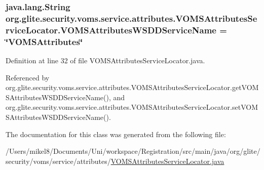 \hypertarget{classorg_1_1glite_1_1security_1_1voms_1_1service_1_1attributes_1_1VOMSAttributesServiceLocator_a67693b0915b16c01b7a636c852553fdd}{
\subsubsection[{VOMSAttributesWSDDServiceName}]{\setlength{\rightskip}{0pt plus 5cm}java.lang.String {\bf org.glite.security.voms.service.attributes.VOMSAttributesServiceLocator.VOMSAttributesWSDDServiceName} = \char`\"{}VOMSAttributes\char`\"{}}}
\label{classorg_1_1glite_1_1security_1_1voms_1_1service_1_1attributes_1_1VOMSAttributesServiceLocator_a67693b0915b16c01b7a636c852553fdd}


Definition at line 32 of file VOMSAttributesServiceLocator.java.



Referenced by org.glite.security.voms.service.attributes.VOMSAttributesServiceLocator.getVOMSAttributesWSDDServiceName(), and org.glite.security.voms.service.attributes.VOMSAttributesServiceLocator.setVOMSAttributesWSDDServiceName().



The documentation for this class was generated from the following file:\begin{DoxyCompactItemize}
\item 
/Users/mikel8/Documents/Uni/workspace/Registration/src/main/java/org/glite/security/voms/service/attributes/\hyperlink{VOMSAttributesServiceLocator_8java}{VOMSAttributesServiceLocator.java}\end{DoxyCompactItemize}
